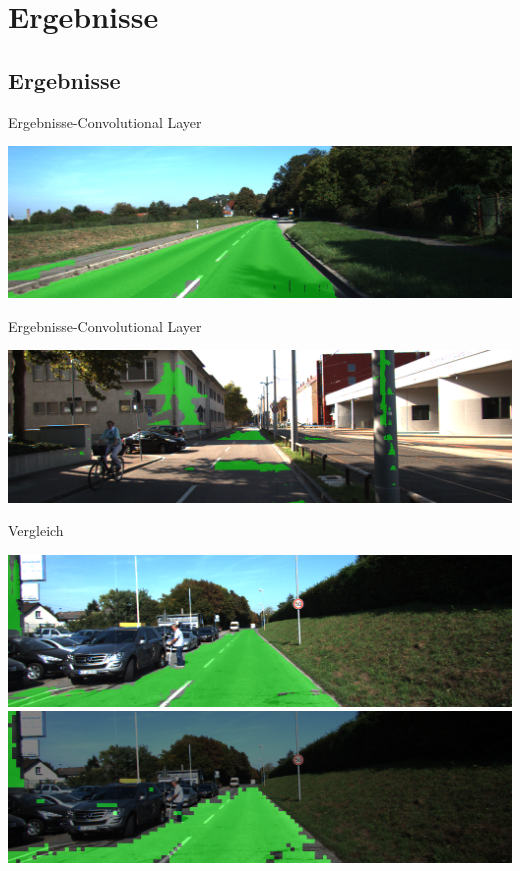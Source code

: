 \section{Ergebnisse}

\subsection{Ergebnisse}

\begin{frame}{Ergebnisse-Convolutional Layer}
 
    \includegraphics[scale=0.2]{../images/Convolutional/um_000014+-overlay-fully-49-patch.png}
\end{frame}    
    
 \begin{frame}{Ergebnisse-Convolutional Layer}
 
    \includegraphics[scale=0.2]{../images/Convolutional/um_000066-overlay-fully-49-patch.png}
 \end{frame}     

\begin{frame}{Vergleich}

      \includegraphics[scale=0.2]{../images/Convolutional/um_000014-overlay-fully-49-patch.png}
         \vspace{0.1cm}
    \includegraphics[scale=0.2]{../images/Convolutional/um_000014-overlay.png}

\end{frame}

